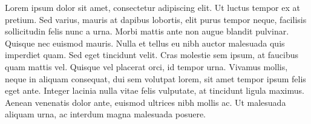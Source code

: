 Lorem ipsum dolor sit amet, consectetur adipiscing elit. Ut luctus tempor ex at pretium. Sed varius, mauris at dapibus lobortis, elit purus tempor neque, facilisis sollicitudin felis nunc a urna. Morbi mattis ante non augue blandit pulvinar. Quisque nec euismod mauris. Nulla et tellus eu nibh auctor malesuada quis imperdiet quam. Sed eget tincidunt velit. Cras molestie sem ipsum, at faucibus quam mattis vel. Quisque vel placerat orci, id tempor urna. Vivamus mollis, neque in aliquam consequat, dui sem volutpat lorem, sit amet tempor ipsum felis eget ante. Integer lacinia nulla vitae felis vulputate, at tincidunt ligula maximus. Aenean venenatis dolor ante, euismod ultrices nibh mollis ac. Ut malesuada aliquam urna, ac interdum magna malesuada posuere.